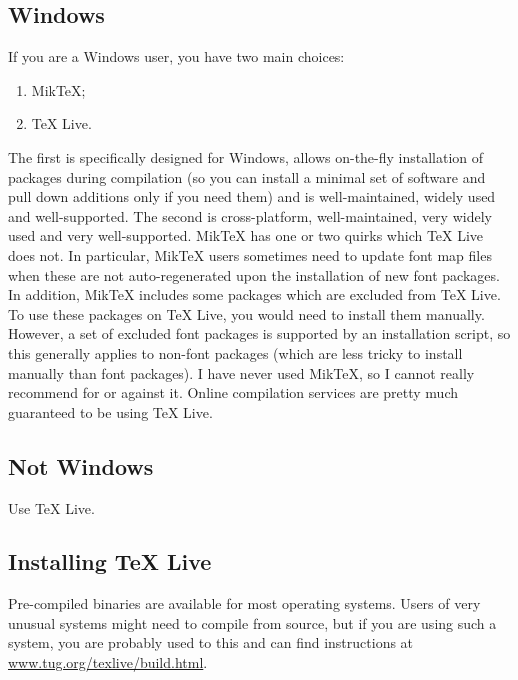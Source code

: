 
\subsection<1-| beamer:0>{Windows}\label{subsec:win}

If you are a Windows user, you have two main choices:
\begin{enumerate}
  \item Mik\TeX{};
  \item \TeX{} Live.
\end{enumerate}
The first is specifically designed for Windows, allows on-the-fly installation of packages during compilation (so you can install a minimal set of software and pull down additions only if you need them) and is well-maintained, widely used and well-supported.
The second is cross-platform, well-maintained, very widely used and very well-supported.
Mik\TeX{} has one or two quirks which \TeX{} Live does not.
In particular, Mik\TeX{} users sometimes need to update font map files when these are not auto-regenerated upon the installation of new font packages. 
In addition, Mik\TeX{} includes some packages which are excluded from \TeX{} Live.
To use these packages on \TeX{} Live, you would need to install them manually.
However, a set of excluded font packages is supported by an installation script, so this generally applies to non-font packages (which are less tricky to install manually than font packages).
I have never used Mik\TeX{}, so I cannot really recommend for or against it.
Online compilation services are pretty much guaranteed to be using \TeX{} Live.


\subsection<1-| beamer:0>{Not Windows}\label{subsec:not-win}

Use \TeX{} Live.


\subsection<1-| beamer:0>{Installing \TeX{} Live}\label{subsec:tl}

Pre-compiled binaries are available for most operating systems.
Users of very unusual systems might need to compile from source, but if you are using such a system, you are probably used to this and can find instructions at \url{www.tug.org/texlive/build.html}.

